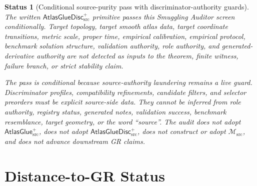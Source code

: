 \documentclass[11pt]{article}
\newcommand{\Msrc}{\mathcal{M}_{\mathrm{src}}}
\newcommand{\AtlasGlue}{\mathsf{AtlasGlue}_{\mathrm{src}}^{+}}
\newcommand{\AtlasGlueDisc}{\mathsf{AtlasGlueDisc}_{\mathrm{src}}^{+}}
\newtheorem{status}{Status}
\begin{document}
\begin{status}[Conditional source-purity pass with discriminator-authority guards]
The written \(\AtlasGlueDisc\) primitive passes this Smuggling Auditor screen
conditionally. Target topology, target smooth atlas data, target coordinate
transitions, metric scale, proper time, empirical calibration, empirical
protocol, benchmark solution structure, validation authority, role authority,
and generated-derivative authority are not detected as inputs to the theorem,
finite witness, failure branch, or strict stability claim.

The pass is conditional because source-authority laundering remains a live
guard. Discriminator profiles, compatibility refinements, candidate filters,
and selector preorders must be explicit source-side data. They cannot be
inferred from role authority, registry status, generated notes, validation
success, benchmark resemblance, target geometry, or the word ``source''. The
audit does not adopt \(\AtlasGlue\), does not adopt \(\AtlasGlueDisc\), does
not construct or adopt \(\Msrc\), and does not advance downstream GR claims.
\end{status}

\section{Distance-to-GR Status}
\end{document}
